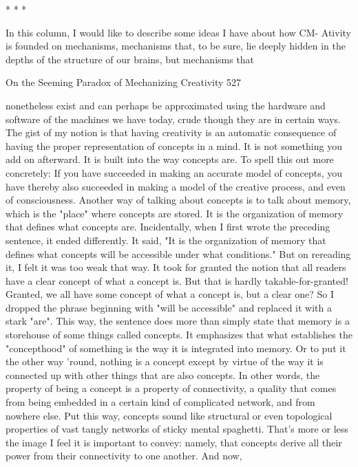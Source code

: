 *   *   *

       In this column, I would like to describe some ideas I have about how CM-
Ativity is founded on mechanisms, mechanisms that, to be sure, lie deeply hidden in
the depths of the structure of our brains, but mechanisms that




On the Seeming Paradox of Mechanizing Creativity                                       527

nonetheless exist and can perhaps be approximated using the hardware and software
of the machines we have today, crude though they are in certain ways. The gist of my
notion is that having creativity is an automatic consequence of having the proper
representation of concepts in a mind. It is not something you add on afterward. It is
built into the way concepts are. To spell this out more concretely: If you have
succeeded in making an accurate model of concepts, you have thereby also succeeded
in making a model of the creative process, and even of consciousness.
        Another way of talking about concepts is to talk about memory, which is the
"place" where concepts are stored. It is the organization of memory that defines what
concepts are. Incidentally, when I first wrote the preceding sentence, it ended
differently. It said, "It is the organization of memory that defines what concepts will
be accessible under what conditions." But on rereading it, I felt it was too weak that
way. It took for granted the notion that all readers have a clear concept of what a
concept is. But that is hardly takable-for-granted! Granted, we all have some concept
of what a concept is, but a clear one?
        So I dropped the phrase beginning with "will be accessible" and replaced it
with a stark "are". This way, the sentence does more than simply state that memory is
a storehouse of some things called concepts. It emphasizes that what establishes the
"concepthood" of something is the way it is integrated into memory. Or to put it the
other way 'round, nothing is a concept except by virtue of the way it is connected up
with other things that are also concepts. In other words, the property of being a
concept is a property of connectivity, a quality that comes from being embedded in a
certain kind of complicated network, and from nowhere else. Put this way, concepts
sound like structural or even topological properties of vast tangly networks of sticky
mental spaghetti.
        That's more or less the image I feel it is important to convey: namely, that
concepts derive all their power from their connectivity to one another. And now,

